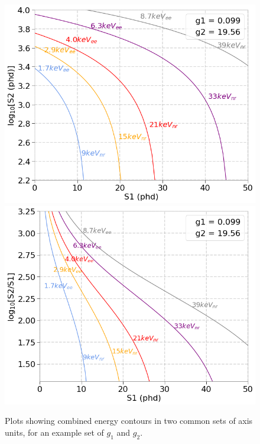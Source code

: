 \begin{figure}[htbp]
\begin{center}
\includegraphics[width=\textwidth]{figures/lxetpcs/E_contours.png} \\
\includegraphics[width=\textwidth]{figures/lxetpcs/E_contours2.png}
\caption{Plots showing combined energy contours in two common sets of axis units, for an example set of $g_{1}$ and $g_{2}$.}
\label{fig:e_contours}
\end{center}
\end{figure}


